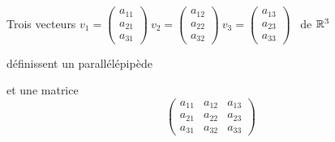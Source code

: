 \begin{frame}

  Trois vecteurs
$
v_1=\begin{pmatrix}a_{11}\\a_{21}\\a_{31}\end{pmatrix} \
v_2=\begin{pmatrix}a_{12}\\a_{22}\\a_{32}\end{pmatrix} \
v_3=\begin{pmatrix}a_{13}\\a_{23}\\a_{33}\end{pmatrix}$ \
 de $\mathbb{R}^3$
\pause
\medskip

définissent un parallélépipède


\pause
  et une matrice %
\[ 
\begin{pmatrix}
a_{11}&a_{12}&a_{13}\\
a_{21}&a_{22}&a_{23}\\
a_{31}&a_{32}&a_{33}
\end{pmatrix}
\]

\end{frame}


